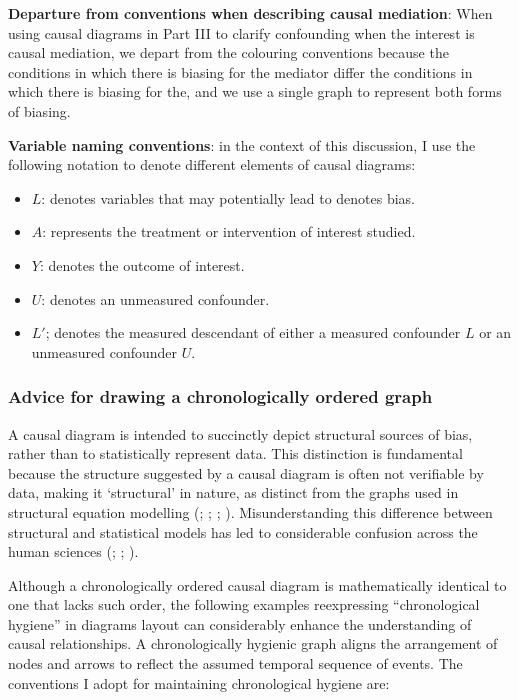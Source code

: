 \documentclass[
  singlecolumn,
  9pt]{article}
\providecommand{\tightlist}{%
  \setlength{\itemsep}{0pt}\setlength{\parskip}{0pt}}\usepackage{longtable,booktabs,array}
\begin{document}
\textbf{Departure from conventions when describing causal mediation}:
When using causal diagrams in Part III to clarify confounding when the
interest is causal mediation, we depart from the colouring conventions
because the conditions in which there is biasing for the mediator differ
the conditions in which there is biasing for the, and we use a single
graph to represent both forms of biasing.

\textbf{Variable naming conventions}: in the context of this discussion,
I use the following notation to denote different elements of causal
diagrams:

\begin{itemize}
\tightlist
\item
  \(L\): denotes variables that may potentially lead to denotes bias.
\item
  \(A\): represents the treatment or intervention of interest studied.
\item
  \(Y\): denotes the outcome of interest.
\item
  \(U\): denotes an unmeasured confounder.
\item
  \(L'\); denotes the measured descendant of either a measured
  confounder \(L\) or an unmeasured confounder \(U\).
\end{itemize}

\subsubsection{Advice for drawing a chronologically ordered
graph}\label{advice-for-drawing-a-chronologically-ordered-graph}

A causal diagram is intended to succinctly depict structural sources of
bias, rather than to statistically represent data. This distinction is
fundamental because the structure suggested by a causal diagram is often
not verifiable by data, making it `structural' in nature, as distinct
from the graphs used in structural equation modelling
(;
;
;
). Misunderstanding this
difference between structural and statistical models has led to
considerable confusion across the human sciences
(;
;
).

Although a chronologically ordered causal diagram is mathematically
identical to one that lacks such order, the following examples
reexpressing ``chronological hygiene'' in diagrams layout can
considerably enhance the understanding of causal relationships. A
chronologically hygienic graph aligns the arrangement of nodes and
arrows to reflect the assumed temporal sequence of events. The
conventions I adopt for maintaining chronological hygiene are:
\end{document}
